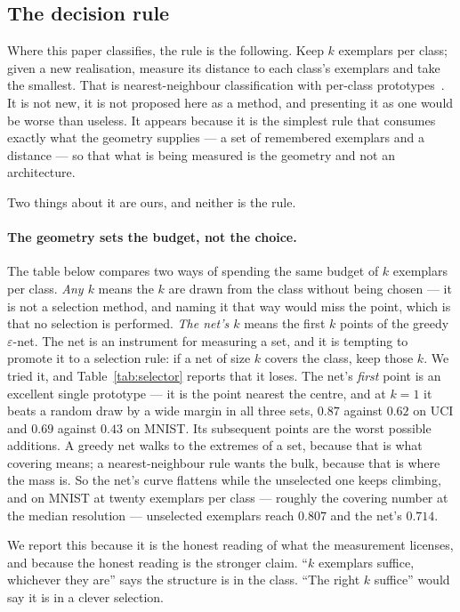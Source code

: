 \documentclass[10pt]{article}
\theoremstyle{plain}
\theoremstyle{definition}
\theoremstyle{remark}
\begin{document}
\subsection{The decision rule}

Where this paper classifies, the rule is the following. Keep $k$ exemplars per
class; given a new realisation, measure its distance to each class's exemplars
and take the smallest. That is nearest-neighbour classification with per-class
prototypes~\citep{cover1967nearest}. It is not new, it is not proposed here as a
method, and presenting it as one would be worse than useless. It appears
because it is the simplest rule that consumes exactly what the geometry
supplies --- a set of remembered exemplars and a distance --- so that what is
being measured is the geometry and not an architecture.

Two things about it are ours, and neither is the rule.

\paragraph{The geometry sets the budget, not the choice.}
The table below compares two ways of spending the same budget of $k$ exemplars
per class. \emph{Any $k$} means the $k$ are drawn from the class without being
chosen --- it is not a selection method, and naming it that way would miss the
point, which is that no selection is performed. \emph{The net's $k$} means the
first $k$ points of the greedy $\varepsilon$-net. The net is an instrument for
measuring a set, and it is tempting to promote it to a selection rule: if a net
of size $k$ covers the class, keep those $k$. We tried it, and
Table~\ref{tab:selector} reports that it loses. The net's \emph{first} point is an excellent single prototype
--- it is the point nearest the centre, and at $k=1$ it beats a random draw by
a wide margin in all three sets, $0.87$ against $0.62$ on UCI and $0.69$
against $0.43$ on MNIST. Its subsequent points are the worst possible
additions. A greedy net walks to the extremes of a set, because that is what
covering means; a nearest-neighbour rule wants the bulk, because that is where
the mass is. So the net's curve flattens while the unselected one keeps
climbing, and on MNIST at twenty exemplars per class --- roughly the covering
number at the median resolution --- unselected exemplars reach $0.807$ and the
net's $0.714$.

We report this because it is the honest reading of what the measurement
licenses, and because the honest reading is the stronger claim. ``$k$ exemplars
suffice, whichever they are'' says the structure is in the class. ``The right
$k$ suffice'' would say it is in a clever selection.
\end{document}
